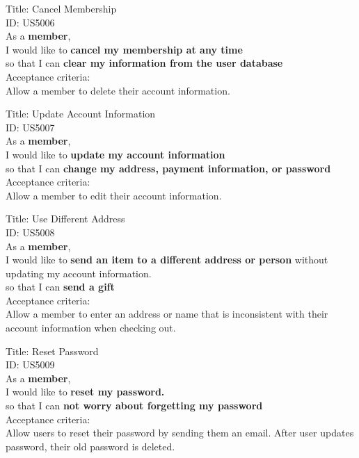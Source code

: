 \documentclass{article}
\begin{document}
\begin{framed}
\noindent
Title:  Cancel Membership \\
ID: US5006 \\
As a \textbf{member},\\
\textbullet  \quad \quad I would like to \textbf{cancel my membership at any time}\\ 
\textbullet  \quad \quad so that I can \textbf{clear my information from the user database}\\
Acceptance criteria: \\
\textbullet  \quad \quad Allow a member to delete their account information.
\end{framed}


\begin{framed}
\noindent
Title:  Update Account Information \\
ID: US5007 \\
As a \textbf{member},\\
\textbullet  \quad \quad I would like to \textbf{update my account information}\\ 
\textbullet  \quad \quad so that I can \textbf{change my address, payment information, or password}\\
Acceptance criteria: \\
\textbullet  \quad \quad Allow a member to edit their account information.
\end{framed}


\begin{framed}
\noindent
Title:  Use Different Address \\
ID: US5008 \\
As a \textbf{member},\\
\textbullet  \quad \quad I would like to \textbf{send an item to a different address or person} without updating my account information.\\
\textbullet  \quad \quad so that I can \textbf{send a gift}\\
Acceptance criteria: \\
\textbullet  \quad \quad Allow a member to enter an address or name that is inconsistent with their account information when checking out.
\end{framed}

\begin{framed}
\noindent
Title:  Reset Password \\
ID: US5009 \\
As a \textbf{member},\\
\textbullet  \quad \quad I would like to \textbf{reset my password.}\\
\textbullet  \quad \quad so that I can \textbf{not worry about forgetting my password}\\
Acceptance criteria: \\
\textbullet  \quad \quad Allow users to reset their password by sending them an email.
\textbullet  \quad \quad After user updates password, their old password is deleted.
\end{framed}
\end{document}
